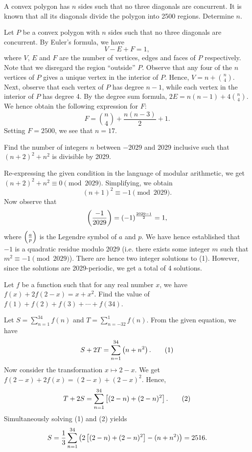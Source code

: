 \clearpage
\begin{question}[17]\label{A::2024-O-1-16}
    A convex polygon has $n$ sides such that no three diagonals are concurrent. It is known that all its diagonals divide the polygon into 2500 regions. Determine $n$.
\end{question}

Let $P$ be a convex polygon with $n$ sides such that no three diagonals are concurrent. By Euler's formula, we have \[V - E + F = 1,\] where $V$, $E$ and $F$ are the number of vertices, edges and faces of $P$ respectively. Note that we disregard the region ``outside'' $P$. Observe that any four of the $n$ vertices of $P$ gives a unique vertex in the interior of $P$. Hence, $V = n + \binom{n}{4}$. Next, observe that each vertex of $P$ has degree $n-1$, while each vertex in the interior of $P$ has degree 4. By the degree sum formula, $2E = n(n-1) + 4\binom{n}{4}$. We hence obtain the following expression for $F$: \[F = \binom{n}{4} + \frac{n(n-3)}2 + 1.\] Setting $F = 2500$, we see that $n = 17$.

\begin{question}[4]\label{A::2024-O-1-17}
    Find the number of integers $n$ between $-2029$ and 2029 inclusive such that $(n+2)^2 + n^2$ is divisible by 2029.
\end{question}

Re-expressing the given condition in the language of modular arithmetic, we get $(n+2)^2 + n^2 \equiv 0 \pmod{2029}$. Simplifying, we obtain \[(n+1)^2 \equiv -1 \pmod{2029}.\tag{1}\] Now observe that \[\left( \frac{-1}{2029} \right) = (-1)^{\frac{2029-1}{2}} = 1,\] where $\left( \frac{a}{p} \right)$ is the Legendre symbol of $a$ and $p$. We have hence established that $-1$ is a quadratic residue modulo 2029 (i.e. there exists some integer $m$ such that $m^2 \equiv -1 \pmod{2029}$). There are hence two integer solutions to (1). However, since the solutions are 2029-periodic, we get a total of 4 solutions.

\begin{question}[2516]\label{A::2024-O-1-18}
    Let $f$ be a function such that for any real number $x$, we have $f(x) + 2f(2-x) = x + x^2$. Find the value of $f(1) + f(2) + f(3) + \cdots + f(34)$.
\end{question}

Let $S = \sum_{n=1}^{34} f(n)$ and $T = \sum_{n=-32}^1 f(n)$. From the given equation, we have \[S + 2T = \sum_{n=1}^{34} \left( n + n^2 \right). \tag{1}\] Now consider the transformation $x \mapsto 2-x$. We get $f(2-x) + 2f(x) = (2-x) + (2-x)^2$. Hence, \[T + 2S = \sum_{n=1}^{34} \left[ (2-n) + (2-n)^2 \right]. \tag{2}\] Simultaneously solving (1) and (2) yields \[S = \frac13 \sum_{n=1}^{34} \left( 2\left[ (2-n) + (2-n)^2 \right] - (n + n^2) \right) = 2516.\]

